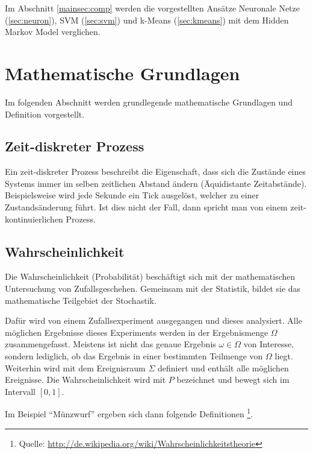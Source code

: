 Im Abschnitt \ref{mainsec:comp} werden die vorgestellten Ansätze Neuronale Netze (\ref{sec:neuron}), SVM (\ref{sec:svm}) und k-Means (\ref{sec:kmeans}) mit dem Hidden Markov Model verglichen.



\section{Mathematische Grundlagen}
Im folgenden Abschnitt werden grundlegende mathematische Grundlagen und Definition vorgestellt.

\subsection{Zeit-diskreter Prozess}
\label{sec:timedisc}
Ein zeit-diskreter Prozess beschreibt die Eigenschaft, dass sich die Zustände eines Systems immer im selben zeitlichen Abstand ändern (Äquidistante Zeitabstände). Beispielsweise wird jede Sekunde ein Tick ausgelöst, welcher zu einer Zustandsänderung führt. 
Ist dies nicht der Fall, dann spricht man von einem zeit-kontinuierlichen Prozess.

\subsection{Wahrscheinlichkeit}
\label{sec:prop}
Die Wahrscheinlichkeit (Probabilität) beschäftigt sich mit der mathematischen Untersuchung von Zufallsgeschehen. Gemeinsam mit der  Statistik, bildet sie das mathematische Teilgebiet der Stochastik.

Dafür wird von einem Zufallsexperiment ausgegangen und dieses analysiert. Alle möglichen Ergebnisse dieses Experiments werden in der Ergebnismenge $\Omega$ zusammengefasst. Meistens ist nicht das genaue Ergebnis $\omega \in \Omega$ von Interesse, sondern lediglich, ob das Ergebnis in einer bestimmten Teilmenge von $\Omega$ liegt. Weiterhin wird mit dem Ereignisraum $\Sigma$ definiert und enthält alle möglichen Ereignisse. Die Wahrscheinlichkeit wird mit $P$ bezeichnet und bewegt sich im Intervall $[0, 1]$. 

Im Beispiel ``Münzwurf'' ergeben sich dann folgende Definitionen \footnote{Quelle: \url{http://de.wikipedia.org/wiki/Wahrscheinlichkeitstheorie}}.

